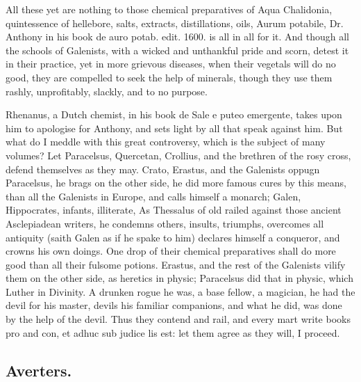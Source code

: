 All these yet are nothing to those chemical preparatives of Aqua
Chalidonia, quintessence of hellebore, salts, extracts, distillations,
oils, Aurum potabile, \etc{} Dr. Anthony in his book \textlatin{de auro potab. edit.
1600}. is all in all for it. And though all the schools of
Galenists, with a wicked and unthankful pride and scorn, detest it in
their practice, yet in more grievous diseases, when their vegetals will
do no good, they are compelled to seek the help of minerals, though
they use them rashly, unprofitably, slackly, and to no purpose.

Rhenanus, a Dutch chemist, in his book \textlatin{de Sale e puteo emergente}, takes
upon him to apologise for Anthony, and sets light by all that speak
against him. But what do I meddle with this great controversy, which is
the subject of many volumes? Let Paracelsus, Quercetan, Crollius, and
the brethren of the rosy cross, defend themselves as they may. Crato,
Erastus, and the Galenists oppugn Paracelsus, he brags on the other
side, he did more famous cures by this means, than all the Galenists in
Europe, and calls himself a monarch; Galen, Hippocrates, infants,
illiterate, \etc{} As Thessalus of old railed against those ancient
Asclepiadean writers, he condemns others, insults, triumphs,
overcomes all antiquity (saith Galen as if he spake to him) declares
himself a conqueror, and crowns his own doings. One drop of their
chemical preparatives shall do more good than all their fulsome
potions. Erastus, and the rest of the Galenists vilify them on the
other side, as heretics in physic; Paracelsus did that in physic,
which Luther in Divinity. A drunken rogue he was, a base fellow,
a magician, he had the devil for his master, devils his familiar
companions, and what he did, was done by the help of the devil. Thus
they contend and rail, and every mart write books pro and con, et adhuc
sub judice lis est: let them agree as they will, I proceed.

\subsection{Averters.}

